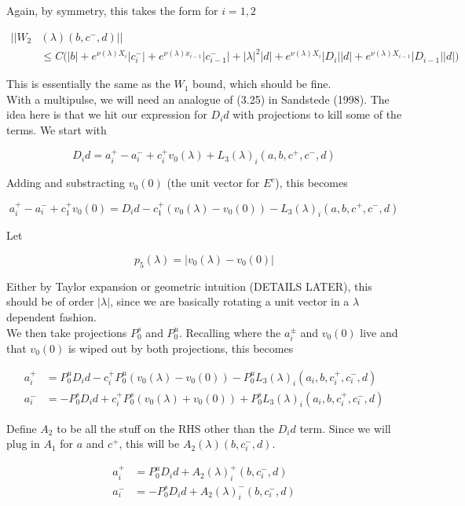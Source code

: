 \documentclass[12pt]{article}
\begin{document}
\begin{enumerate}
Again, by symmetry, this takes the form for $i = 1, 2$

\begin{align*}
||W_2&(\lambda)(b,c^-,d)|| \\
&\leq C\Big( |b| + e^{\nu(\lambda) X_i} |c_i^-| +  e^{\nu(\lambda) x_{i-1}} |c_{i-1}^-| + |\lambda|^2 |d| + e^{\nu(\lambda) X_i} |D_i| |d| + e^{\nu(\lambda) X_{i-1}} |D_{i-1}| |d| \Big)
\end{align*}

This is essentially the same as the $W_1$ bound, which should be fine.\\

With a multipulse, we will need an analogue of (3.25) in Sandstede (1998). The idea here is that we hit our expression for $D_i d$ with projections to kill some of the terms. We start with

\[
D_i d = a_i^+ - a_i^- + c_i^+ v_0(\lambda) + L_3(\lambda)_i(a, b, c^+, c^-, d)
\]

Adding and substracting $v_0(0)$ (the unit vector for $E^c$), this becomes

\[
a_i^+ - a_i^- + c_1^+ v_0(0) = D_i d - c_1^+ (v_0(\lambda) - v_0(0)) - L_3(\lambda)_i(a, b, c^+, c^-, d)
\]

Let 

\[
p_5(\lambda) = |v_0(\lambda) - v_0(0)| 
\]

Either by Taylor expansion or geometric intuition (DETAILS LATER), this should be of order $|\lambda|$, since we are basically rotating a unit vector in a $\lambda$ dependent fashion.\\

We then take projections $P^s_0$ and $P^u_0$. Recalling where the $a_i^\pm$ and $v_0(0)$ live and that $v_0(0)$ is wiped out by both projections, this becomes 

\begin{align*}
a_i^+ &= P^u_0 D_i d - c_i^+ P^u_0 (v_0(\lambda) - v_0(0)) - P^u_0 L_3(\lambda)_i(a_i, b, c_i^+, c_i^-, d) \\
a_i^- &= -P^s_0 D_i d + c_i^+ P^s_0 (v_0(\lambda) + v_0(0)) + P^s_0 L_3(\lambda)_i(a_i, b, c_i^+, c_i^-, d)
\end{align*}

Define $A_2$ to be all the stuff on the RHS other than the $D_i d$ term. Since we will plug in $A_1$ for $a$ and $c^+$, this will be $A_2(\lambda)(b, c_i^-, d)$.

\begin{align*}
a_i^+ &= P^u_0 D_i d + A_2(\lambda)_i^+(b, c_i^-, d) \\
a_i^- &= -P^s_0 D_i d + A_2(\lambda)_i^-(b, c_i^-, d)
\end{align*}


\end{enumerate}
\end{document}
